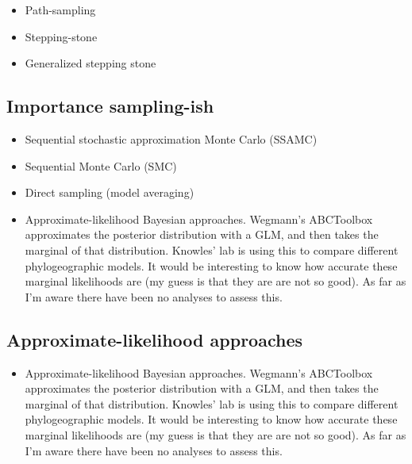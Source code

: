 \begin{itemize}
    \item Path-sampling \citep{Lartillot2006}
    \item Stepping-stone \citep{Xie2011}
    \item Generalized stepping stone \citep{Fan2011}
\end{itemize}

\subsection{Importance sampling-ish}

\begin{itemize}
    \item Sequential stochastic approximation Monte Carlo (SSAMC)
        \citep{Liang2007,Cheon2008}
    \item Sequential Monte Carlo (SMC) \citep{Jordan2012}
    \item Direct sampling (model averaging)
    \item Approximate-likelihood Bayesian approaches. Wegmann's ABCToolbox
        approximates the posterior distribution with a GLM, and then takes the
        marginal of that distribution. Knowles' lab is using this to compare
        different phylogeographic models. It would be interesting to know how
        accurate these marginal likelihoods are (my guess is that they are are
        not so good). As far as I'm aware there have been no analyses to assess
        this.
\end{itemize}

\subsection{Approximate-likelihood approaches}

\begin{itemize}
    \item Approximate-likelihood Bayesian approaches. Wegmann's ABCToolbox
        approximates the posterior distribution with a GLM, and then takes the
        marginal of that distribution. Knowles' lab is using this to compare
        different phylogeographic models. It would be interesting to know how
        accurate these marginal likelihoods are (my guess is that they are are
        not so good). As far as I'm aware there have been no analyses to assess
        this.
\end{itemize}

